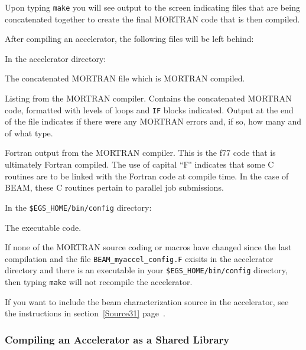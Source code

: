 \documentclass[12pt,twoside]{article}
\begin{document}
Upon typing {\tt make} you will see output to the screen indicating files
that are being concatenated together to create the final MORTRAN code
that is then compiled.

After compiling an accelerator, the following files will be left behind:
\begin{description}
\item In the accelerator directory:
\begin{description}
\item[{\tt mortjob.mortran}] The concatenated MORTRAN file which is MORTRAN
compiled.
\item[{\tt BEAM\_myaccel\_config.mortlst}] Listing from the MORTRAN compiler.
Contains the concatenated MORTRAN code, formatted with levels of
loops and {\tt IF} blocks indicated.  Output at the end of the file indicates
if there were any MORTRAN errors and, if so, how many and of what type.
\item[{\tt BEAM\_myaccel\_config.F}] Fortran output from the MORTRAN compiler.
This is the f77 code that is ultimately Fortran compiled.  The use of
capital ``F" indicates that some C routines are to be linked with the
Fortran code at compile time.  In the case of BEAM, these C routines pertain
to parallel job submissions.
\end{description}
\item In the {\tt \$EGS\_HOME/bin/config} directory:
\begin{description}
\item[{\tt BEAM\_myaccel*}] The executable code.
\end{description}
\end{description}

If none of the MORTRAN source coding or macros have changed since the last
compilation and the file {\tt BEAM\_myaccel\_config.F} exisits in the
accelerator directory and there is an executable in your
{\tt \$EGS\_HOME/bin/config} directory, then typing {\tt make} will not recompile
the accelerator.

If you want to include the beam characterization source in the accelerator,
see the instructions in section~\ref{Source31} page~\pageref{Source31}.

\subsubsection{Compiling an Accelerator as a Shared Library}
\label{sharedlibsect}
\end{document}
